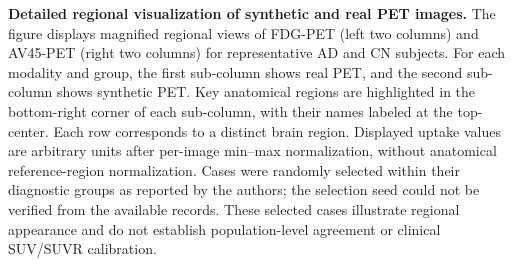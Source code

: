\caption{
\textbf{Detailed regional visualization of synthetic and real PET images.}
The figure displays magnified regional views of FDG-PET (left two columns) and AV45-PET (right two columns) for representative AD and CN subjects. 
For each modality and group, the first sub-column shows real PET, and the second sub-column shows synthetic PET. 
Key anatomical regions are highlighted in the bottom-right corner of each sub-column, with their names labeled at the top-center. 
Each row corresponds to a distinct brain region. Displayed uptake values are arbitrary units after per-image min--max normalization, without anatomical reference-region normalization. Cases were randomly selected within their diagnostic groups as reported by the authors; the selection seed could not be verified from the available records. These selected cases illustrate regional appearance and do not establish population-level agreement or clinical SUV/SUVR calibration.
}
    \label{fig:3}
